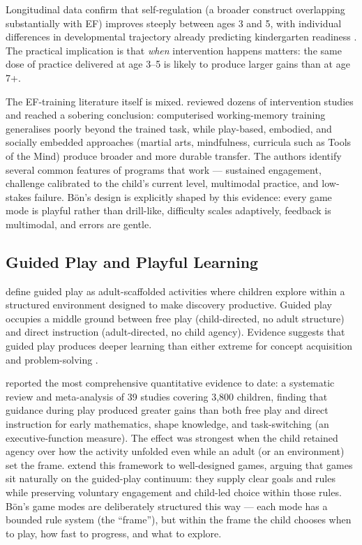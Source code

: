 \documentclass[12pt, a4paper]{article}
\newcommand{\Bodn}{B\"o\dh{}n}
\begin{document}
Longitudinal data confirm that self-regulation (a broader construct overlapping
substantially with EF) improves steeply between ages 3 and 5, with individual
differences in developmental trajectory already predicting kindergarten
readiness \citep{montroy2016development}. The practical implication is that
\emph{when} intervention happens matters: the same dose of practice delivered at
age 3--5 is likely to produce larger gains than at age 7+.

The EF-training literature itself is mixed. \citet{diamond2016conclusions}
reviewed dozens of intervention studies and reached a sobering conclusion:
computerised working-memory training generalises poorly beyond the trained task,
while play-based, embodied, and socially embedded approaches (martial arts,
mindfulness, curricula such as Tools of the Mind) produce broader and more
durable transfer. The authors identify several common features of programs that
work --- sustained engagement, challenge calibrated to the child's current
level, multimodal practice, and low-stakes failure. \Bodn{}'s design is
explicitly shaped by this evidence: every game mode is playful rather than
drill-like, difficulty scales adaptively, feedback is multimodal, and errors are
gentle.

\subsection{Guided Play and Playful Learning}
\label{sec:guided_play}

\citet{weisberg2013guided} define guided play as adult-scaffolded activities
where children explore within a structured environment designed to make
discovery productive. Guided play occupies a middle ground between free play
(child-directed, no adult structure) and direct instruction (adult-directed,
no child agency). Evidence suggests that guided play produces deeper learning
than either extreme for concept acquisition and problem-solving
\citep{hirshpasek2015putting}.

\citet{skene2022guided} reported the most comprehensive quantitative evidence to
date: a systematic review and meta-analysis of 39 studies covering 3{,}800
children, finding that guidance during play produced greater gains than both
free play and direct instruction for early mathematics, shape knowledge, and
task-switching (an executive-function measure). The effect was strongest when
the child retained agency over how the activity unfolded even while an adult
(or an environment) set the frame. \citet{hassingerdas2017more} extend this
framework to well-designed games, arguing that games sit naturally on the
guided-play continuum: they supply clear goals and rules while preserving
voluntary engagement and child-led choice within those rules. \Bodn{}'s game
modes are deliberately structured this way --- each mode has a bounded rule
system (the ``frame''), but within the frame the child chooses when to play,
how fast to progress, and what to explore.
\end{document}
